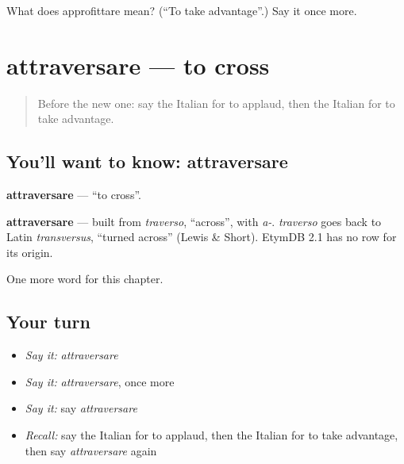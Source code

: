 \begin{tcolorbox}[breakable,colback=teal!4,colframe=teal!35!black,title={Before you move on}]
What does approfittare mean? (\textquotedblleft{}To take advantage\textquotedblright{}.) Say it once more.
\end{tcolorbox}
\section[attraversare]{attraversare — to cross}

\label{lesson:IT-C208-attraversare}



\begin{quote}
Before the new one: say the Italian for to applaud, then the Italian for to take advantage.
\end{quote}

\subsection*{You'll want to know: attraversare}
\textbf{attraversare} — \textquotedblleft{}to cross\textquotedblright{}.

\begin{cousinweb}
\textbf{attraversare} — built from \emph{traverso}, \textquotedblleft{}across\textquotedblright{}, with \emph{a-}. \emph{traverso} goes back to Latin \emph{transversus}, \textquotedblleft{}turned across\textquotedblright{} (Lewis \& Short). EtymDB 2.1 has no row for its origin.
\end{cousinweb}

\begin{grammarlens}[title={What you've built}]
One more word for this chapter.
\end{grammarlens}

\subsection*{Your turn}
\begin{itemize}
\raggedright
  \item \emph{Say it:} \emph{attraversare}
  \item \emph{Say it:} \emph{attraversare}, once more
  \item \emph{Say it:} say \emph{attraversare}
  \item \emph{Recall:} say the Italian for to applaud, then the Italian for to take advantage, then say \emph{attraversare} again
\end{itemize}

